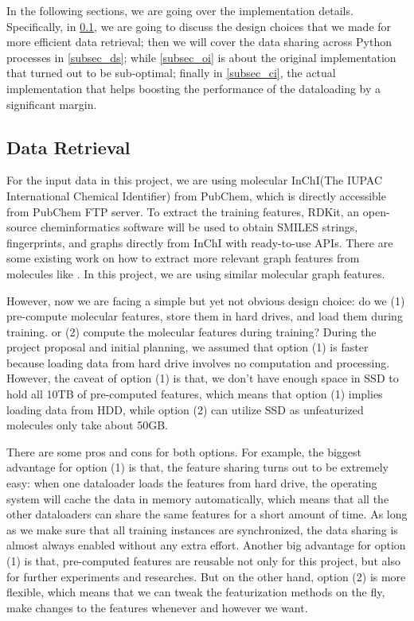 \documentclass[conference]{IEEEtran}
\begin{document}
In the following sections, we are going over the implementation details. 
Specifically, in \ref{subsec_dr}, we are going to discuss the design choices that we made for more efficient data retrieval; then we will cover the data sharing across Python processes in \ref{subsec_ds}; while \ref{subsec_oi} is about the original implementation that turned out to be sub-optimal; finally in \ref{subsec_ci}, the actual implementation that helps boosting the performance of the dataloading by a significant margin.

\subsection{Data Retrieval} \label{subsec_dr} 

For the input data in this project, we are using molecular InChI(The IUPAC International Chemical Identifier) from PubChem, which is directly accessible from PubChem FTP server. 
To extract the training features, RDKit, an open-source cheminformatics software will be used to obtain SMILES strings, fingerprints, and graphs directly from InChI with ready-to-use APIs. 
There are some existing work on how to extract more relevant graph features from molecules like \cite{gcn_fp}. In this project, we are using similar molecular graph features. 

However, now we are facing a simple but yet not obvious design choice: do we (1) pre-compute molecular features, store them in hard drives, and load them during training. or (2) compute the molecular features during training? 
During the project proposal and initial planning, we assumed that option (1) is faster because loading data from hard drive involves no computation and processing. 
However, the caveat of option (1) is that, we don't have enough space in SSD to hold all 10TB of pre-computed features, which means that option (1) implies loading data from HDD, while option (2) can utilize SSD as unfeaturized molecules only take about 50GB. 

There are some pros and cons for both options. 
For example, the biggest advantage for option (1) is that, the feature sharing turns out to be extremely easy: when one dataloader loads the features from hard drive, the operating system will cache the data in memory automatically, which means that all the other dataloaders can share the same features for a short amount of time. 
As long as we make sure that all training instances are synchronized, the data sharing is almost always enabled without any extra effort. 
Another big advantage for option (1) is that, pre-computed features are reusable not only for this project, but also for further experiments and researches. 
But on the other hand, option (2) is more flexible, which means that we can tweak the featurization methods on the fly, make changes to the features whenever and however we want. 
\end{document}
